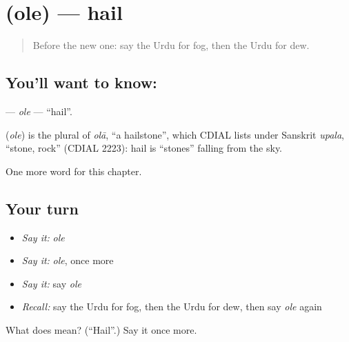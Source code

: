 \section[\texorpdfstring{\ur{اولے} (ole)}{اولے (ole)}]{ (ole) — hail}

\label{lesson:UR-C233-ole}



\begin{quote}
Before the new one: say the Urdu for fog, then the Urdu for dew.
\end{quote}

\subsection*{You'll want to know: }
\textbf{} — \emph{ole} — \textquotedblleft{}hail\textquotedblright{}.

\begin{cousinweb}
\textbf{} (\emph{ole}) is the plural of \emph{olā}, \textquotedblleft{}a hailstone\textquotedblright{}, which CDIAL lists under Sanskrit \emph{upala}, \textquotedblleft{}stone, rock\textquotedblright{} (CDIAL 2223): hail is \textquotedblleft{}stones\textquotedblright{} falling from the sky.
\end{cousinweb}

\begin{grammarlens}[title={What you've built}]
One more word for this chapter.
\end{grammarlens}

\subsection*{Your turn}
\begin{itemize}
\raggedright
  \item \emph{Say it:} \emph{ole}
  \item \emph{Say it:} \emph{ole}, once more
  \item \emph{Say it:} say \emph{ole}
  \item \emph{Recall:} say the Urdu for fog, then the Urdu for dew, then say \emph{ole} again
\end{itemize}

\begin{tcolorbox}[breakable,colback=teal!4,colframe=teal!35!black,title={Before you move on}]
What does  mean? (\textquotedblleft{}Hail\textquotedblright{}.) Say it once more.
\end{tcolorbox}
